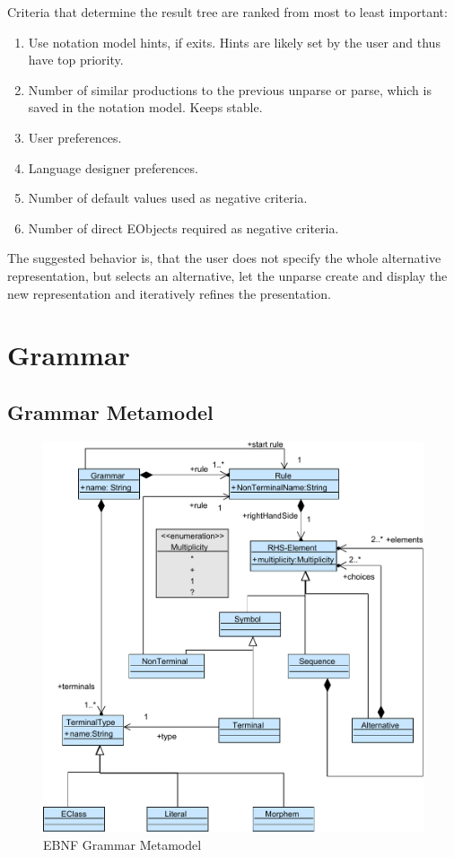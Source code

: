 Criteria that determine the result tree are ranked from most to least important:
\begin{enumerate}
	\item Use notation model hints, if exits. Hints are likely set by the user and thus have top priority.
	\item Number of similar productions to the previous unparse or parse, which is saved in the notation model. Keeps stable.
	\item User preferences.
	\item Language designer preferences.
	\item Number of default values used as negative criteria.
	\item Number of direct EObjects required as negative criteria.
\end{enumerate}


The suggested behavior is, that the user does not specify the whole alternative representation, but selects an alternative, let the unparse create and display the new representation and iteratively refines the presentation. 


\section{Grammar}
\subsection{Grammar Metamodel}
\begin{figure}
\centering
\includegraphics[scale=0.85]{gfx/ex/Grammar_CFG} 
\caption{EBNF Grammar Metamodel}
\label{MM:EBNF}
\end{figure}

